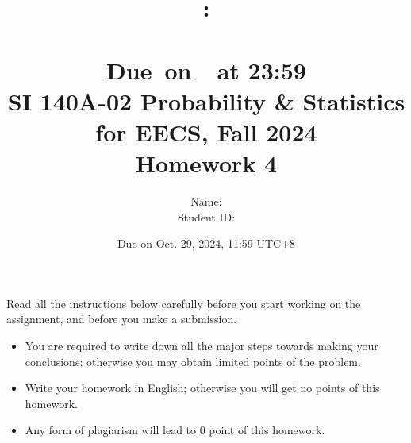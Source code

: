 \documentclass[a4paper]{article}
\title{
    \vspace{2in}
    \textmd{\textbf{\hmwkClass:\\  \hmwkTitle}}\\
    \normalsize\vspace{0.1in}\small{Due\ on\ \hmwkDueDate\ at 23:59}\\
	\vspace{4in}
}
\author{
	Name: \textbf{\hmwkAuthorName} \\
	Student ID: \hmwkAuthorID}
\date{}
\begin{document}

\date{
Due on Oct. 29, 2024, 11:59 UTC+8}
\title{SI 140A-02  Probability \& Statistics for EECS, Fall 2024 \\
Homework 4}
\maketitle
Read all the instructions below carefully before you start working on the assignment, and before you make a submission.
\begin{itemize}
    \item You are required to write down all the major steps towards making your conclusions; otherwise you may obtain limited points of the problem.
    \item Write your homework in English; otherwise you will get no points of this homework.
    \item Any form of plagiarism will lead to $0$ point of this homework. 
\end{itemize}
\newpage
\end{document}
